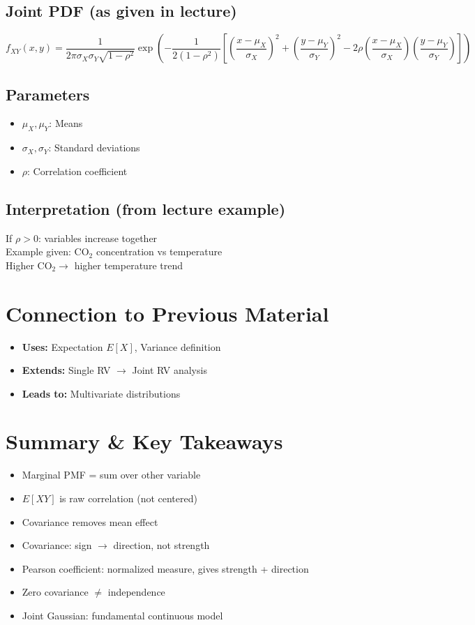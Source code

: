 \documentclass[11pt]{article}
\begin{document}
\subsection{Joint PDF (as given in lecture)}
\[
f_{XY}(x,y) =
\frac{1}{2\pi \sigma_X \sigma_Y \sqrt{1-\rho^2}}
\exp\left(
-\frac{1}{2(1-\rho^2)}
\left[
\left(\frac{x-\mu_X}{\sigma_X}\right)^2
+
\left(\frac{y-\mu_Y}{\sigma_Y}\right)^2
-
2\rho \left(\frac{x-\mu_X}{\sigma_X}\right)\left(\frac{y-\mu_Y}{\sigma_Y}\right)
\right]
\right)
\]

\subsection{Parameters}
\begin{itemize}
    \item $\mu_X, \mu_Y$: Means
    \item $\sigma_X, \sigma_Y$: Standard deviations
    \item $\rho$: Correlation coefficient
\end{itemize}

\subsection{Interpretation (from lecture example)}
If $\rho > 0$: variables increase together \\
Example given: CO$_2$ concentration vs temperature \\
Higher CO$_2 \rightarrow$ higher temperature trend

\section{Connection to Previous Material}
\begin{itemize}
    \item \textbf{Uses:} Expectation $E[X]$, Variance definition
    \item \textbf{Extends:} Single RV $\rightarrow$ Joint RV analysis
    \item \textbf{Leads to:} Multivariate distributions
\end{itemize}

\section{Summary \& Key Takeaways}
\begin{itemize}
    \item Marginal PMF = sum over other variable
    \item $E[XY]$ is raw correlation (not centered)
    \item Covariance removes mean effect
    \item Covariance: sign $\rightarrow$ direction, not strength
    \item Pearson coefficient: normalized measure, gives strength + direction
    \item Zero covariance $\neq$ independence
    \item Joint Gaussian: fundamental continuous model
\end{itemize}
\end{document}
